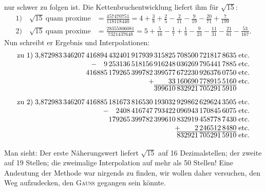 nur schwer zu folgen ist. Die Kettenbruchentwicklung liefert ihm für $\sqrt{15}$:
\begingroup\small
\[
\begin{aligned}
\text{1)}\quad\sqrt{15}\ \text{quam proxime}&=\frac{457470751}{118118440}=4+\frac{3}{8}+\frac{2}{5}-\frac{2}{11}-\frac{9}{19}-\frac{20}{71}+\frac{7}{199}\\[4pt]
\text{2)}\quad\sqrt{15}\ \text{quam proxime}&=\frac{28355806081}{7321437648}=5+\frac{5}{16}-\frac{1}{7}+\frac{1}{9}-\frac{9}{23}-\frac{11}{31}-\frac{21}{61}-\frac{53}{167}.
\end{aligned}
\]
\endgroup
\noindent Nun schreibt er Ergebnis und Interpolationen:
\begingroup\small\setlength{\arraycolsep}{2pt}
\[
\begin{array}{r@{\;}r@{\;}l}
\text{zu 1)}&3{,}872983\,346207\,416894\,432401\,917939\,315825\,708500\,721817\,8635&\text{etc.}\\
&-\quad9\,253136\,518156\,916248\,036269\,795441\,7885&\text{etc.}\\
&416885\,179265\,399782\,399577\,672230\,926376\,0750&\text{etc.}\\
&+\qquad33\,160690\,778915\,5160&\text{etc.}\\[-2pt]
&\overline{399610\,832921\,705291\,5910}&
\end{array}
\]
\endgroup
\clearpage{}
\begingroup\small\setlength{\arraycolsep}{2pt}
\[
\begin{array}{r@{\;}r@{\;}l}
\text{zu 2)}&3{,}872983\,346207\,416885\,181673\,816530\,193032\,929862\,629624\,3505&\text{etc.}\\
&-\quad2408\,416747\,793422\,096943\,170845\,6075&\text{etc.}\\
&179265\,399782\,399610\,832919\,458778\,7430&\text{etc.}\\
&+\qquad2\,246512\,8480&\text{etc.}\\[-2pt]
&\overline{832921\,705291\,5910}&\text{etc.}
\end{array}
\]
\endgroup
\par\noindent\hspace*{\parindent}Man sieht: Der erste Näherungswert liefert $\sqrt{15}$ auf 16 Dezimalstellen;
der zweite auf 19 Stellen; die zweimalige Interpolation auf mehr als 50
Stellen! Eine Andeutung der Methode war nirgends zu finden, wir wollen
daher versuchen, den Weg aufzudecken, den \textsc{Gauss} gegangen sein könnte.

